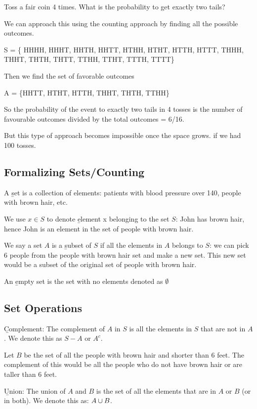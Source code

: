 \documentclass[12pt, titlepage, oneside]{article}
\begin{document}
\ex Toss a fair coin 4 times. What is the probability to get exactly two tails? 

We can approach this using the counting approach by finding all the possible outcomes.

S = \{ HHHH, HHHT, HHTH, HHTT, HTHH, HTHT, HTTH, HTTT, THHH, THHT, THTH, THTT, TTHH, TTHT, TTTH, TTTT\}

Then we find the set of favorable outcomes

A = \{HHTT, HTHT, HTTH, THHT, THTH, TTHH\}

So the probability of the event to exactly two tails in 4 tosses is the number of favourable outcomes divided by the total outcomes = 6/16.

But this type of approach becomes impossible once the space grows. \ex if we had 100 tosses. 
	
\subsection{Formalizing Sets/Counting}

A \b{set} is a collection of elements: \ex patients with blood pressure over 140, people with brown hair, etc.

We use $x \in S$ to denote \b{element} x belonging to the set $S$: \ex John has brown hair, hence John is an element in the set of people with brown hair.

We say a set $A$ is a \b{subset} of $S$ if all the elements in $A$ belongs to $S$: \ex we can pick 6 people from the people with brown hair set and make a new set. This new set would be a subset of the original set of people with brown hair.

An \b{empty set} is the set with no elements denoted as $\emptyset$

\subsection{Set Operations}

\b{Complement}: The complement of $A$ in $S$ is all the elements in $S$ that are not in $A$. We denote this as $S-A$ or $A^c$. 

\ex Let $B$ be the set of all the people with brown hair and shorter than 6 feet. The complement of this would be all the people who do not have brown hair or are taller than 6 feet. 

\b{Union}: The union of $A$ and $B$ is the set of all the elements that are in $A$ or $B$ (or in both). We denote this as: $A \cup B$.
\end{document}
